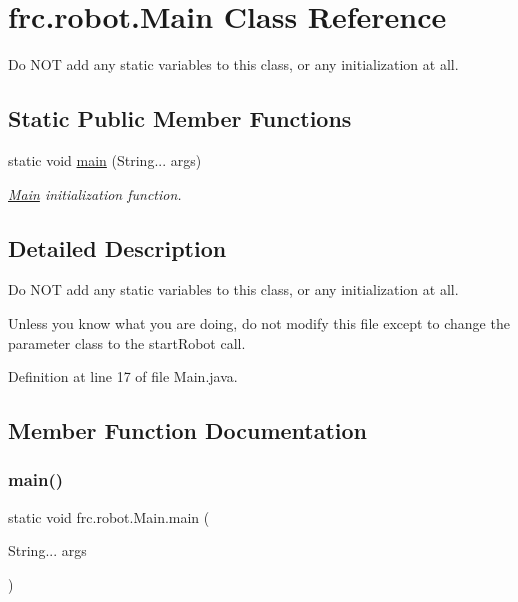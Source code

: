\hypertarget{classfrc_1_1robot_1_1_main}{}\section{frc.\+robot.\+Main Class Reference}
\label{classfrc_1_1robot_1_1_main}


Do N\+OT add any static variables to this class, or any initialization at all.  


\subsection*{Static Public Member Functions}
\begin{DoxyCompactItemize}
\item 
static void \hyperlink{classfrc_1_1robot_1_1_main_ae60066a646cefc16d3e7d57b8fa22097}{main} (String... args)
\begin{DoxyCompactList}\small\item\em \hyperlink{classfrc_1_1robot_1_1_main}{Main} initialization function. \end{DoxyCompactList}\end{DoxyCompactItemize}


\subsection{Detailed Description}
Do N\+OT add any static variables to this class, or any initialization at all. 

Unless you know what you are doing, do not modify this file except to change the parameter class to the start\+Robot call. 

Definition at line 17 of file Main.\+java.



\subsection{Member Function Documentation}
\mbox{\label{classfrc_1_1robot_1_1_main_ae60066a646cefc16d3e7d57b8fa22097}} 
\subsubsection{\texorpdfstring{main()}{main()}}
{\footnotesize\ttfamily static void frc.\+robot.\+Main.\+main (\begin{DoxyParamCaption}\item[{String...}]{args }\end{DoxyParamCaption})\hspace{0.3cm}{\ttfamily [static]}}




